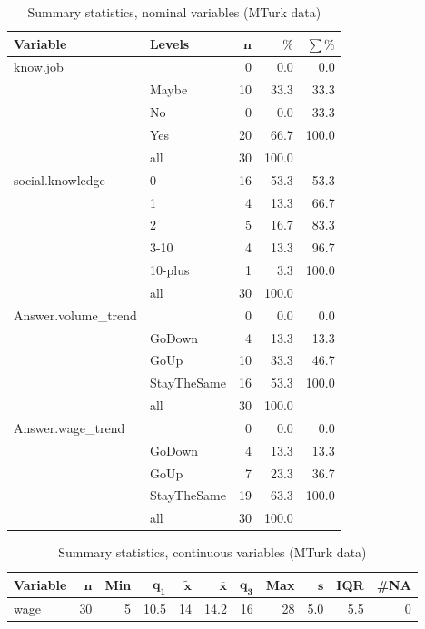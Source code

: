 \documentclass[a4paper,10pt]{article}\usepackage[]{graphicx}\usepackage[]{color}
\begin{document}
\begin{table}[ht]
\centering
{\footnotesize
\begin{tabular}{ll|rrr}
 \textbf{Variable} & \textbf{Levels} & $\mathbf{n}$ & $\mathbf{\%}$ & $\mathbf{\sum \%}$ \\ 
  \hline
know.job &  & 0 & 0.0 & 0.0 \\ 
   & Maybe & 10 & 33.3 & 33.3 \\ 
   & No & 0 & 0.0 & 33.3 \\ 
   & Yes & 20 & 66.7 & 100.0 \\ 
   \hline
 & all & 30 & 100.0 &  \\ 
   \hline
\hline
social.knowledge & 0 & 16 & 53.3 & 53.3 \\ 
   & 1 & 4 & 13.3 & 66.7 \\ 
   & 2 & 5 & 16.7 & 83.3 \\ 
   & 3-10 & 4 & 13.3 & 96.7 \\ 
   & 10-plus & 1 & 3.3 & 100.0 \\ 
   \hline
 & all & 30 & 100.0 &  \\ 
   \hline
\hline
Answer.volume\_trend &  & 0 & 0.0 & 0.0 \\ 
   & GoDown & 4 & 13.3 & 13.3 \\ 
   & GoUp & 10 & 33.3 & 46.7 \\ 
   & StayTheSame & 16 & 53.3 & 100.0 \\ 
   \hline
 & all & 30 & 100.0 &  \\ 
   \hline
\hline
Answer.wage\_trend &  & 0 & 0.0 & 0.0 \\ 
   & GoDown & 4 & 13.3 & 13.3 \\ 
   & GoUp & 7 & 23.3 & 36.7 \\ 
   & StayTheSame & 19 & 63.3 & 100.0 \\ 
   \hline
 & all & 30 & 100.0 &  \\ 
   \hline
\hline
\end{tabular}
}
\caption{Summary statistics, nominal variables (MTurk data)} 
\label{tab1:41-3090}
\end{table}
\begin{table}[ht]
\centering
{\footnotesize
\begin{tabular}{lrrrrrrrrrr}
 \textbf{Variable} & $\mathbf{n}$ & \textbf{Min} & $\mathbf{q_1}$ & $\mathbf{\widetilde{x}}$ & $\mathbf{\bar{x}}$ & $\mathbf{q_3}$ & \textbf{Max} & $\mathbf{s}$ & \textbf{IQR} & \textbf{\#NA} \\ 
  \hline
wage & 30 & 5 & 10.5 & 14 & 14.2 & 16 & 28 & 5.0 & 5.5 & 0 \\ 
  \end{tabular}
}
\caption{Summary statistics, continuous variables (MTurk data)} 
\label{tab2:41-3090}
\end{table}
\end{document}
